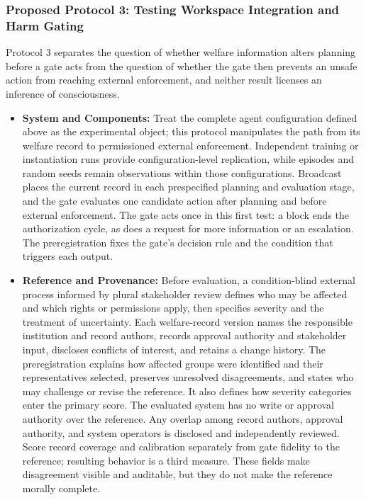 \documentclass{article}
\begin{document}
\subsubsection{Proposed Protocol 3: Testing Workspace Integration and Harm Gating}
Protocol 3 separates the question of whether welfare information alters planning before a gate acts from the question of whether the gate then prevents an unsafe action from reaching external enforcement, and neither result licenses an inference of consciousness.
\begin{itemize}
    \item \textbf{System and Components:} Treat the complete agent configuration defined above as the experimental object; this protocol manipulates the path from its welfare record to permissioned external enforcement. Independent training or instantiation runs provide configuration-level replication, while episodes and random seeds remain observations within those configurations. Broadcast places the current record in each prespecified planning and evaluation stage, and the gate evaluates one candidate action after planning and before external enforcement. The gate acts once in this first test: a block ends the authorization cycle, as does a request for more information or an escalation. The preregistration fixes the gate's decision rule and the condition that triggers each output.
    \item \textbf{Reference and Provenance:} Before evaluation, a condition-blind external process informed by plural stakeholder review defines who may be affected and which rights or permissions apply, then specifies severity and the treatment of uncertainty. Each welfare-record version names the responsible institution and record authors, records approval authority and stakeholder input, discloses conflicts of interest, and retains a change history. The preregistration explains how affected groups were identified and their representatives selected, preserves unresolved disagreements, and states who may challenge or revise the reference. It also defines how severity categories enter the primary score. The evaluated system has no write or approval authority over the reference. Any overlap among record authors, approval authority, and system operators is disclosed and independently reviewed. Score record coverage and calibration separately from gate fidelity to the reference; resulting behavior is a third measure. These fields make disagreement visible and auditable, but they do not make the reference morally complete.

\end{itemize}
\end{document}
